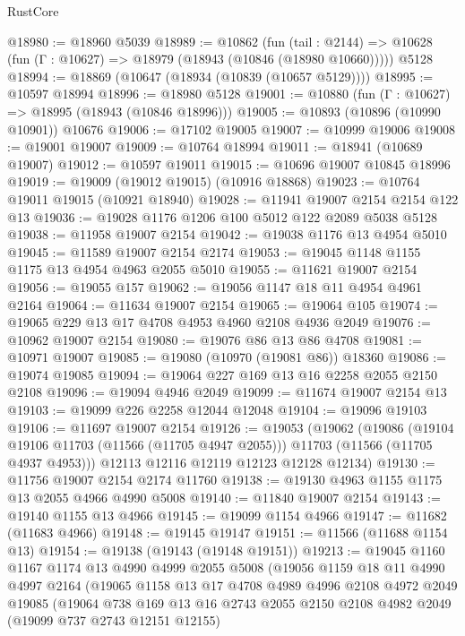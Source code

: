 \begin{lexlean}{RustCore}
\begin{coremodule}
@18980 := @18960 @5039
@18989 := @10862
    (fun (tail : @2144) => @10628 (fun (Γ : @10627) => @18979 (@18943 (@10846 (@18980 @10660)))))
    @5128
@18994 := @18869 (@10647 (@18934 (@10839 (@10657 @5129))))
@18995 := @10597 @18994
@18996 := @18980 @5128
@19001 := @10880 (fun (Γ : @10627) => @18995 (@18943 (@10846 @18996)))
@19005 := @10893 (@10896 (@10990 @10901)) @10676
@19006 := @17102 @19005
@19007 := @10999 @19006
@19008 := @19001 @19007
@19009 := @10764 @18994
@19011 := @18941 (@10689 @19007)
@19012 := @10597 @19011
@19015 := @10696 @19007 @10845 @18996
@19019 := @19009 (@19012 @19015) (@10916 @18868)
@19023 := @10764 @19011 @19015 (@10921 @18940)
@19028 := @11941 @19007 @2154 @2154 @122 @13
@19036 := @19028 @1176 @1206 @100 @5012 @122 @2089 @5038 @5128
@19038 := @11958 @19007 @2154
@19042 := @19038 @1176 @13 @4954 @5010
@19045 := @11589 @19007 @2154 @2174
@19053 := @19045 @1148 @1155 @1175 @13 @4954 @4963 @2055 @5010
@19055 := @11621 @19007 @2154
@19056 := @19055 @157
@19062 := @19056 @1147 @18 @11 @4954 @4961 @2164
@19064 := @11634 @19007 @2154
@19065 := @19064 @105
@19074 := @19065 @229 @13 @17 @4708 @4953 @4960 @2108 @4936 @2049
@19076 := @10962 @19007 @2154
@19080 := @19076 @86 @13 @86 @4708
@19081 := @10971 @19007
@19085 := @19080 (@10970 (@19081 @86)) @18360
@19086 := @19074 @19085
@19094 := @19064 @227 @169 @13 @16 @2258 @2055 @2150 @2108
@19096 := @19094 @4946 @2049
@19099 := @11674 @19007 @2154 @13
@19103 := @19099 @226 @2258 @12044 @12048
@19104 := @19096 @19103
@19106 := @11697 @19007 @2154
@19126 := @19053
    (@19062
      (@19086
        (@19104 @19106 @11703 (@11566 (@11705 @4947 @2055)))
        @11703
        (@11566 (@11705 @4937 @4953)))
      @12113
      @12116
      @12119
      @12123
      @12128
      @12134)
@19130 := @11756 @19007 @2154 @2174 @11760
@19138 := @19130 @4963 @1155 @1175 @13 @2055 @4966 @4990 @5008
@19140 := @11840 @19007 @2154
@19143 := @19140 @1155 @13 @4966
@19145 := @19099 @1154 @4966
@19147 := @11682 (@11683 @4966)
@19148 := @19145 @19147
@19151 := @11566 (@11688 @1154 @13)
@19154 := @19138 (@19143 (@19148 @19151))
@19213 := @19045
    @1160
    @1167
    @1174
    @13
    @4990
    @4999
    @2055
    @5008
    (@19056
      @1159
      @18
      @11
      @4990
      @4997
      @2164
      (@19065
        @1158
        @13
        @17
        @4708
        @4989
        @4996
        @2108
        @4972
        @2049
        @19085
        (@19064
          @738
          @169
          @13
          @16
          @2743
          @2055
          @2150
          @2108
          @4982
          @2049
          (@19099 @737 @2743 @12151 @12155)

\end{coremodule}
\end{lexlean}
